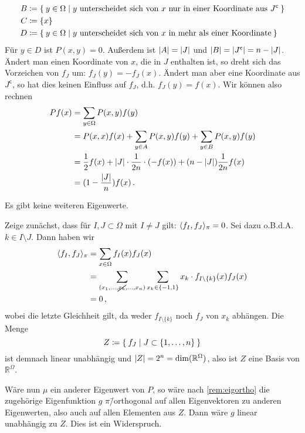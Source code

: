 \documentclass[ngerman,a4paper,11pt]{scrartcl}
\newcommand{\stcomp}[1]{{#1}^{\mathsf{c}}} %
\newcommand{\RR}{\mathbb{R}}
\DeclarePairedDelimiter{\sprod}{\langle}{\rangle}	%
\DeclarePairedDelimiter{\abs}{\lvert}{\rvert}		%
\begin{document}
\begin{exmp}
\begin{dproof}
\begin{align*}
  B&\coloneqq\Set{y\in\Omega\mid\text{$y$ unterscheidet sich von $x$ nur in einer Koordinate aus $\stcomp{J}$}} \\
  C&\coloneqq\{x\} \\
  D&\coloneqq\Set{y\in\Omega\mid\text{$y$ unterscheidet sich von $x$ in mehr als einer Koordinate}}
  \end{align*}
  Für $y\in D$ ist $P(x,y)=0$. Außerdem ist $\abs{A}=\abs{J}$ und $\abs{B}=\abs{\stcomp{J}}=n-\abs{J}$.
  Ändert man einen Koordinate von $x$, die in $J$ enthalten ist, so dreht sich
  das Vorzeichen von $f_J$ um: $f_J(y)=-f_J(x)$. Ändert man aber eine Koordinate
  aus $\stcomp{J}$, so hat dies keinen Einfluss auf $f_J$, d.h. $f_J(y)=f(x)$.
  Wir können also rechnen
  \begin{align*}
  Pf(x)&=\sum_{y\in\Omega}P(x,y)f(y) \\
  &=P(x,x)f(x)+\sum_{y\in A}P(x,y)f(y)+\sum_{y\in B}P(x,y)f(y) \\
  &=\frac{1}{2}f(x)+\abs{J}\cdot\frac{1}{2n}\cdot(-f(x))+(n-\abs{J})\frac{1}{2n}f(x) \\
  &=(1-\frac{\abs{J}}{n})f(x)\, .
  \end{align*}
 \end{dproof}
 \begin{claim}
  Es gibt keine weiteren Eigenwerte.
 \end{claim}
 \begin{dproof}
  Zeige zunächst, dass für $I,J\subset\Omega$ mit $I\neq J$ gilt: $\sprod{f_I,f_J}_\pi=0$.
  Sei dazu o.B.d.A. $k\in I\setminus J$. Dann haben wir
  \begin{align*}
   \sprod{f_I,f_J}_\pi&=\sum_{x\in\Omega}f_I(x)f_J(x) \\
   &=\sum_{(x_1,\dotsc,\cancel{x_k},\dotsc,x_n)}\sum_{x_k\in\{-1,1\}}x_k\cdot f_{I\setminus\{k\}}(x)f_J(x) \\
   &=0\, ,
  \end{align*}
  wobei die letzte Gleichheit gilt, da weder $f_{I\setminus\{k\}}$ noch $f_J$ von
  $x_k$ abhängen. 
  Die Menge
  \begin{equation*}
   Z\coloneqq\Set{f_J\mid J\subset\{1,\dotsc,n\}} 
  \end{equation*}
  ist demnach linear unabhängig und $\abs{Z}=2^n=\dim(\RR^\Omega)$, also ist $Z$
  eine Basis von $\RR^\Omega$. 

  Wäre nun $\mu$ ein anderer Eigenwert von $P$, so
  wäre nach \cref{rem:eigortho} die zugehörige Eigenfunktion $g$
  $\pi$\=/orthogonal auf allen Eigenvektoren zu anderen Eigenwerten, also auch auf
  allen Elementen aus $Z$. Dann wäre $g$ linear unabhängig zu $Z$. Dies ist ein Widerspruch.


\end{dproof}
\end{exmp}
\end{document}
